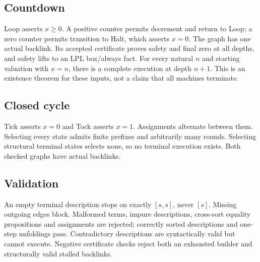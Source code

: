 \subsection{Countdown}
Loop asserts $x\ge0$. A positive counter permits decrement and return to
Loop; a zero counter permits transition to Halt, which asserts $x=0$.
The graph has one actual backlink. Its accepted certificate proves safety
and final zero at all depths, and safety lifts to an LPL box/always fact.
For every natural $n$ and starting valuation with $x=n$, there is a complete
execution at depth $n+1$. This is an existence theorem for these inputs,
not a claim that all machines terminate.

\subsection{Closed cycle}
Tick asserts $x=0$ and Tock asserts $x=1$. Assignments alternate between
them. Selecting every state admits finite prefixes and arbitrarily many
rounds. Selecting structural terminal states selects none, so no terminal
execution exists. Both checked graphs have actual backlinks.

\subsection{Validation}
An empty terminal description stops on exactly $[s,s]$, never $[s]$.
Missing outgoing edges block. Malformed terms, impure descriptions,
cross-sort equality propositions and assignments are rejected; correctly
sorted descriptions and one-step unfoldings pass. Contradictory descriptions
are syntactically valid but cannot execute. Negative certificate checks
reject both an exhausted builder and structurally valid stalled backlinks.
